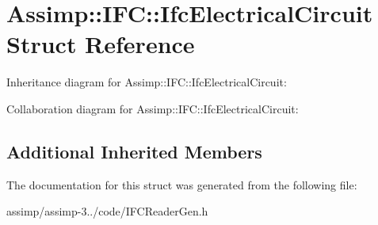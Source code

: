 \hypertarget{struct_assimp_1_1_i_f_c_1_1_ifc_electrical_circuit}{\section{Assimp\+:\+:I\+F\+C\+:\+:Ifc\+Electrical\+Circuit Struct Reference}
\label{struct_assimp_1_1_i_f_c_1_1_ifc_electrical_circuit}
}


Inheritance diagram for Assimp\+:\+:I\+F\+C\+:\+:Ifc\+Electrical\+Circuit\+:


Collaboration diagram for Assimp\+:\+:I\+F\+C\+:\+:Ifc\+Electrical\+Circuit\+:
\subsection*{Additional Inherited Members}


The documentation for this struct was generated from the following file\+:\begin{DoxyCompactItemize}
\item 
assimp/assimp-\/3../code/I\+F\+C\+Reader\+Gen.\+h\end{DoxyCompactItemize}
